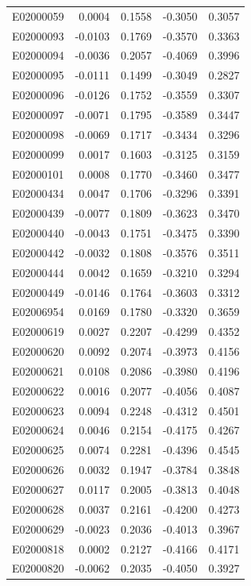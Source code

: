 \documentclass[11pt, a4paper]{article}
\begin{document}
\begin{longtable}{lrrrr}
E02000059 & 0.0004 & 0.1558 & -0.3050 & 0.3057 \\
E02000093 & -0.0103 & 0.1769 & -0.3570 & 0.3363 \\
E02000094 & -0.0036 & 0.2057 & -0.4069 & 0.3996 \\
E02000095 & -0.0111 & 0.1499 & -0.3049 & 0.2827 \\
E02000096 & -0.0126 & 0.1752 & -0.3559 & 0.3307 \\
E02000097 & -0.0071 & 0.1795 & -0.3589 & 0.3447 \\
E02000098 & -0.0069 & 0.1717 & -0.3434 & 0.3296 \\
E02000099 & 0.0017 & 0.1603 & -0.3125 & 0.3159 \\
E02000101 & 0.0008 & 0.1770 & -0.3460 & 0.3477 \\
E02000434 & 0.0047 & 0.1706 & -0.3296 & 0.3391 \\
E02000439 & -0.0077 & 0.1809 & -0.3623 & 0.3470 \\
E02000440 & -0.0043 & 0.1751 & -0.3475 & 0.3390 \\
E02000442 & -0.0032 & 0.1808 & -0.3576 & 0.3511 \\
E02000444 & 0.0042 & 0.1659 & -0.3210 & 0.3294 \\
E02000449 & -0.0146 & 0.1764 & -0.3603 & 0.3312 \\
E02006954 & 0.0169 & 0.1780 & -0.3320 & 0.3659 \\
E02000619 & 0.0027 & 0.2207 & -0.4299 & 0.4352 \\
E02000620 & 0.0092 & 0.2074 & -0.3973 & 0.4156 \\
E02000621 & 0.0108 & 0.2086 & -0.3980 & 0.4196 \\
E02000622 & 0.0016 & 0.2077 & -0.4056 & 0.4087 \\
E02000623 & 0.0094 & 0.2248 & -0.4312 & 0.4501 \\
E02000624 & 0.0046 & 0.2154 & -0.4175 & 0.4267 \\
E02000625 & 0.0074 & 0.2281 & -0.4396 & 0.4545 \\
E02000626 & 0.0032 & 0.1947 & -0.3784 & 0.3848 \\
E02000627 & 0.0117 & 0.2005 & -0.3813 & 0.4048 \\
E02000628 & 0.0037 & 0.2161 & -0.4200 & 0.4273 \\
E02000629 & -0.0023 & 0.2036 & -0.4013 & 0.3967 \\
E02000818 & 0.0002 & 0.2127 & -0.4166 & 0.4171 \\
E02000820 & -0.0062 & 0.2035 & -0.4050 & 0.3927 \\

\end{longtable}
\end{document}
